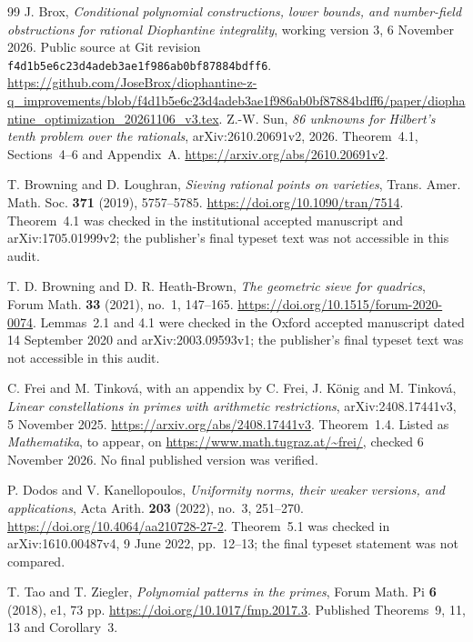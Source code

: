 \documentclass[11pt]{article}
\theoremstyle{definition}
\theoremstyle{remark}
\begin{document}
\begin{thebibliography}{99}
 J. Brox,
\emph{Conditional polynomial constructions, lower bounds, and number-field
obstructions for rational Diophantine integrality}, working version 3,
6 November 2026. Public source at Git revision
\nolinkurl{f4d1b5e6c23d4adeb3ae1f986ab0bf87884bdff6}.
\url{https://github.com/JoseBrox/diophantine-z-q_improvements/blob/f4d1b5e6c23d4adeb3ae1f986ab0bf87884bdff6/paper/diophantine_optimization_20261106_v3.tex}.
Z.-W. Sun, \emph{86 unknowns for Hilbert's tenth problem over the rationals},
arXiv:2610.20691v2, 2026. Theorem~4.1, Sections~4--6 and Appendix~A.
\url{https://arxiv.org/abs/2610.20691v2}.

T. Browning and D. Loughran, \emph{Sieving rational points on varieties},
Trans. Amer. Math. Soc. \textbf{371} (2019), 5757--5785.
\url{https://doi.org/10.1090/tran/7514}.
Theorem~4.1 was checked in the institutional accepted manuscript and
arXiv:1705.01999v2; the publisher's final typeset text was not accessible
in this audit.

T. D. Browning and D. R. Heath-Brown, \emph{The geometric sieve for quadrics},
Forum Math. \textbf{33} (2021), no.~1, 147--165.
\url{https://doi.org/10.1515/forum-2020-0074}.
Lemmas~2.1 and 4.1 were checked in the Oxford accepted manuscript dated
14 September 2020 and arXiv:2003.09593v1; the publisher's final typeset
text was not accessible in this audit.

C. Frei and M. Tinkov\'a, with an appendix by C. Frei, J. K\"onig and
M. Tinkov\'a, \emph{Linear constellations in primes with arithmetic restrictions},
arXiv:2408.17441v3, 5 November 2025.
\url{https://arxiv.org/abs/2408.17441v3}.
Theorem~1.4. Listed as \emph{Mathematika}, to appear, on
\url{https://www.math.tugraz.at/~frei/}, checked 6 November 2026.
No final published version was verified.

P. Dodos and V. Kanellopoulos,
\emph{Uniformity norms, their weaker versions, and applications},
Acta Arith. \textbf{203} (2022), no.~3, 251--270.
\url{https://doi.org/10.4064/aa210728-27-2}.
Theorem~5.1 was checked in arXiv:1610.00487v4, 9 June 2022,
pp.~12--13; the final typeset statement was not compared.

T. Tao and T. Ziegler, \emph{Polynomial patterns in the primes},
Forum Math. Pi \textbf{6} (2018), e1, 73 pp.
\url{https://doi.org/10.1017/fmp.2017.3}.
Published Theorems~9, 11, 13 and Corollary~3.


\end{thebibliography}
\end{document}
